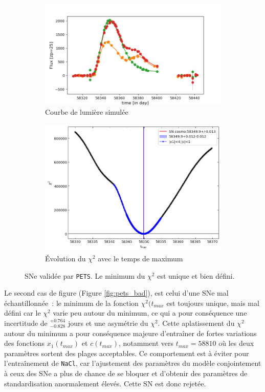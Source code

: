 \documentclass{book}
\def\pets{\texttt{PETS}\xspace}
\def\nacl{\texttt{NaCl}\xspace}
\begin{document}
\begin{figure}[h]
	\begin{subfigure}{0.45\textwidth}
		\centering
		\includegraphics[width=\textwidth]{figures/276_lc_truth.png}
		\caption{Courbe de lumière simulée}
	\end{subfigure}
	\hfill
	\begin{subfigure}{0.45\textwidth}
		\centering
		\includegraphics[width=\textwidth]{figures/276_Tmaxgrid.png}
		\caption{Évolution du $\chi^2$ avec le temps de maximum}
	\end{subfigure}
	\caption{SNe validée par \pets. Le minimum du $\chi^2$ est unique et bien défini.}
	\label{fig:pets_good}
\end{figure}
 
Le second cas de figure (Figure \ref{fig:pets_bad}), est celui d'une SNe mal échantillonnée~: le minimum de la fonction $\chi^2(t_{max}$ est toujours unique, mais mal défini car le $\chi^2$ varie peu autour du minimum, ce qui a pour conséquence une incertitude de $^{+0.764}_{-0.828}$ jours et une asymétrie du $\chi^2$. Cette aplatissement du $\chi^2$ autour du minimum a pour conséquence majeure d'entraîner de fortes variations des fonctions $x_1(t_{max})$ et $c(t_{max})$, notamment vers $t_{max}=58 810$ où les deux paramètres sortent des plages acceptables. Ce comportement est à éviter pour l'entraînement de \nacl, car l'ajustement des paramètres du modèle conjointement à ceux des SNe a plus de chance de se bloquer et d'obtenir des paramètres de standardisation anormalement élevés. Cette SN est donc rejetée.
\end{document}
